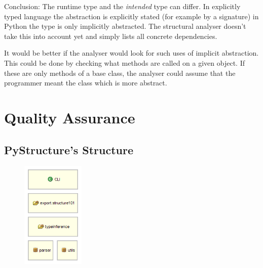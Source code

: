 \documentclass[12pt,halfparskip,DIV11,BCOR10mm]{scrreprt}
\begin{document}
Conclusion: The runtime type and the \emph{intended} type can differ. In explicitly typed language the abstraction is explicitly stated (for example by a signature) in Python the type is only implicitly abstracted. The structural analyser doesn't take this into account yet and simply lists all concrete dependencies.

It would be better if the analyser would look for such uses of implicit abstraction. This could be done by checking what methods are called on a given object. If these are only methods of a base class, the analyser could assume that the programmer meant the class which is more abstract.


\chapter{Quality Assurance}



\section{PyStructure's Structure}

\begin{figure}
    \vspace{-0.7cm}
    \includegraphics[width=3cm]{architecture/parts}
    \vspace{-1.5cm}
\end{figure}
\end{document}
